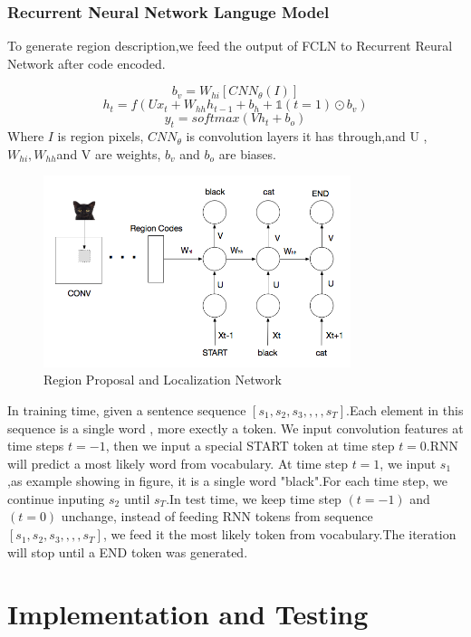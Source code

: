 \documentclass[12pt,a4paper]{report}
\begin{document}
\subsubsection{Recurrent Neural Network Languge Model}
To generate region description,we feed the output of FCLN to Recurrent Reural Network after code encoded.\cite{rnn1}

\[b_v=W_{hi}[CNN_\theta(I)]\]
\[h_t=f(Ux_t+W_{hh}h_{t-1}+b_h+ \mathds{1}(t=1)\odot b_v)\] 
\[y_t=softmax(Vh_t+b_o)\]
Where $I$ is region pixels, $CNN_\theta$ is convolution layers it has through,and U ,$W_{hi},W_{hh}$and V are weights, $b_v$ and $b_o$ are biases.\cite{densecap}\cite{deepvisual}
\begin{figure}[h]
\centering
\includegraphics[width=0.8\textwidth]{rnnt.png}
\caption{Region Proposal and Localization Network}
\end{figure}
In training time, given a sentence sequence $[s_1,s_2,s_3, , , ,s_T]$.Each element in this sequence is a single word , more exectly a token. We input convolution features at time steps $t=-1$, then we input a special START token at time step $t=0$.RNN will predict a most likely word from vocabulary. At time step $t=1$, we input $s_1$,as example showing in figure, it is a single word "black".For each time step, we continue inputing $s_2$ until $s_T$.In test time, we keep time step $(t=-1)$ and $(t=0)$ unchange, instead of feeding RNN tokens from sequence  $[s_1,s_2,s_3, , , ,s_T]$, we feed it the most likely token from vocabulary.The iteration will stop until a END token was generated.

\newpage
\section{Implementation and Testing}
\end{document}
